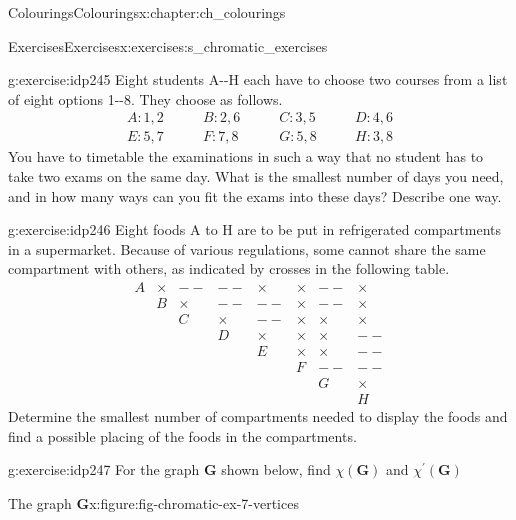 \documentclass[oneside,10pt,]{book}
\numberwithin{equation}{section}
\newcommand{\bfG}{\mathbf{G}}
\newcommand{\amp}{&}
\begin{document}
\begin{chapterptx}{Colourings}{}{Colourings}{}{}{x:chapter:ch_colourings}
\begin{exercises-section}{Exercises}{}{Exercises}{}{}{x:exercises:s_chromatic_exercises}
\begin{divisionexercise}{2}{}{}{g:exercise:idp245}%
Eight students A-{}-{}H each have to choose two courses from a list of eight options 1-{}-{}8. They choose as follows.%
%
\begin{equation*}
\begin{array}{llll}
A : 1,2\qquad \amp B : 2,6 \qquad \amp C : 3,5\qquad \amp D : 4,6 \\
E : 5,7 \amp F : 7,8 \amp G : 5,8 \amp H : 3,8
\end{array}
\end{equation*}
You have to timetable the examinations in such a way that no student has to take two exams on the same day. What is the smallest number of days you need, and in how many ways can you fit the exams into these days? Describe one way.%
\end{divisionexercise}%
\begin{divisionexercise}{3}{}{}{g:exercise:idp246}%
Eight foods A to H are to be put in refrigerated compartments in a supermarket. Because of various regulations, some cannot share the same compartment with others, as indicated by crosses in the following table.%
%
\begin{equation*}
\begin{array}{cccccccc}
A \amp \times \amp -- \amp -- \amp \times  \amp  \times  \amp -- \amp  \times  \\
\amp B \amp  \times  \amp -- \amp -- \amp  \times  \amp -- \amp  \times  \\
\amp \amp C \amp  \times  \amp -- \amp  \times  \amp  \times  \amp  \times  \\
\amp \amp \amp D \amp  \times  \amp  \times  \amp  \times  \amp -- \\
\amp \amp \amp \amp E \amp  \times  \amp  \times  \amp -- \\
\amp \amp \amp \amp \amp F \amp -- \amp -- \\
\amp \amp \amp \amp \amp \amp G \amp  \times   \\
\amp \amp \amp \amp \amp \amp \amp H
\end{array}
\end{equation*}
Determine the smallest number of compartments needed to display the foods and find a possible placing of the foods in the compartments.%
\end{divisionexercise}%
\begin{divisionexercise}{4}{}{}{g:exercise:idp247}%
For the graph \(\bfG\) shown below, find \(\chi(\bfG)\) and \(\chi^\prime(\bfG)\) \begin{figureptx}{The graph \(\bfG\)}{x:figure:fig-chromatic-ex-7-vertices}{}%
\begin{image}{0.15}{0.7}{0.15}%
\end{image}
\end{figureptx}
\end{divisionexercise}
\end{exercises-section}
\end{chapterptx}
\end{document}

